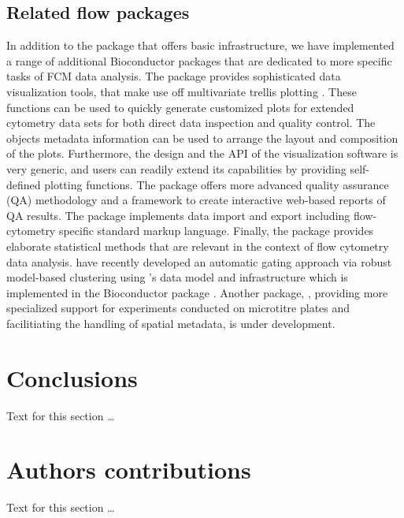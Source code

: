 \documentclass[10pt]{bmc_article}
\newenvironment{bmcformat}{\begin{raggedright}\baselineskip20pt\sloppy\setboolean{publ}{false}}{\end{raggedright}\baselineskip20pt\sloppy}
\begin{document}
\begin{bmcformat}
\subsection*{Related flow packages}

In addition to the  package that offers basic
infrastructure, we have implemented a range of additional Bioconductor
packages that are dedicated to more specific tasks of FCM data
analysis. The  package \citep{sarkar2008ufv}
provides sophisticated data visualization tools, that make use off
multivariate trellis plotting \citep{lattice}.  These functions can be
used to quickly generate customized plots for extended cytometry data
sets for both direct data inspection and quality control.  The objects
metadata information can be used to arrange the layout and composition
of the plots.  Furthermore, the design and the API of the
visualization software is very generic, and users can readily extend
its capabilities by providing self-defined plotting functions.  The
 package offers more advanced quality assurance (QA)
methodology and a framework to create interactive web-based reports of
QA results. The  package implements data import and
export including flow-cytometry specific standard markup
language. Finally, the  package provides elaborate
statistical methods that are relevant in the context of flow
cytometry data analysis. \cite{lo2008agf} have recently developed an
automatic gating approach via robust model-based clustering using
's data model and infrastructure which is
implemented in the Bioconductor package . Another
package, , providing more specialized support for
experiments conducted on microtitre plates and facilitiating the
handling of spatial metadata, is under development.
    

\section*{Conclusions}
  Text for this section \ldots


  


    
\section*{Authors contributions}
    Text for this section \ldots


\end{bmcformat}
\end{document}
